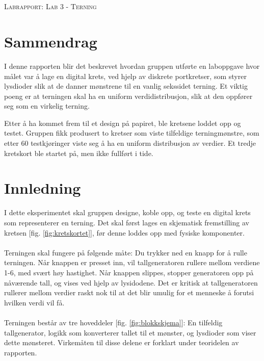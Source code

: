 \documentclass[12pt,norsk,a4paper]{article}
\begin{document}

\clearpage



\section*{} %
\thispagestyle{empty}   
\begin{center}
\Large \textsc{Labrapport: Lab 3 - Terning}
\end{center}
\clearpage

\section*{Sammendrag}
\thispagestyle{empty}  
I denne rapporten blir det beskrevet hvordan gruppen utførte en laboppgave hvor målet var å lage en digital krets, ved hjelp av diskrete portkretser, som styrer lysdioder slik at de danner mønstrene til en vanlig sekssidet terning. Et viktig poeng er at terningen skal ha en uniform verdidistribusjon, slik at den oppfører seg som en virkelig terning.

Etter å ha kommet frem til et design på papiret, ble kretsene loddet opp og testet. Gruppen fikk produsert to kretser som viste tilfeldige terningmønstre, som etter 60 testkjøringer viste seg å ha en uniform distribusjon av verdier. Et tredje kretskort ble startet på, men ikke fullført i tide.
\clearpage

\tableofcontents %
\thispagestyle{empty}   
\clearpage

\section{Innledning} 
\setcounter{page}{1}
I dette eksperimentet skal gruppen designe, koble opp, og teste en digital krets som representerer en terning. Det skal først lages en skjematisk fremstilling av kretsen [fig. \ref{fig:kretskortet}], før denne loddes opp med fysiske komponenter. \\
\\
Terningen skal fungere på følgende måte: Du trykker ned en knapp for å rulle terningen. Når knappen er presset inn, vil tallgeneratoren rullere mellom verdiene 1-6, med svært høy hastighet. Når knappen slippes, stopper generatoren opp på nåværende tall, og vises ved hjelp av lysidodene. Det er kritisk at tallgeneratoren rullerer mellom verdier raskt nok til at det blir umulig for et menneske å forutsi hvilken verdi vil få.\\
\\
Terningen består av tre hoveddeler [fig. \ref{fig:blokkskjema}]: En tilfeldig tallgenerator, logikk som konverterer tallet til et mønster, og lysdioder som viser dette mønsteret. Virkemåten til disse delene er forklart under teoridelen av rapporten.
\end{document}
